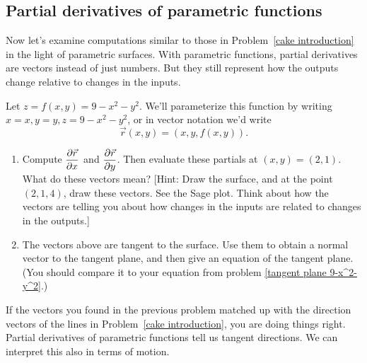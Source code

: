 \subsection{Partial derivatives of parametric functions}

Now let's examine computations similar to those in Problem~\ref{cake introduction} in the light of parametric surfaces.  With parametric functions, partial derivatives are vectors instead of just numbers.  But they still represent how the outputs change relative to changes in the inputs.

\begin{problem}%
%
 Let $z=f(x,y)=9-x^2-y^2$. We'll parameterize this function by writing $x=x, y=y, z=9-x^2-y^2$, or in vector notation we'd write $$\vec r(x,y) = (x,y,f(x,y)).$$ 
\begin{enumerate}
 \item Compute $\displaystyle \frac{\partial \vec r}{\partial x}$ and $\displaystyle \frac{\partial \vec r}{\partial y}$. Then evaluate these partials at $(x,y)=(2,1)$.  What do these vectors mean? [Hint: Draw the surface, and at the point $(2,1,4)$, draw these vectors. See the Sage plot.  Think about how the vectors are telling you about how changes in the inputs are related to changes in the outputs.]
 \item The vectors above are tangent to the surface. Use them to obtain a normal vector to the tangent plane, and then give an equation of the tangent plane. (You should compare it to your equation from problem \ref{tangent plane 9-x^2-y^2}.)
\end{enumerate}
\end{problem}

If the vectors you found in the previous problem matched up with the direction vectors of the lines in Problem~\ref{cake introduction}, you are doing things right.  Partial derivatives of parametric functions tell us tangent directions.  We can interpret this also in terms of motion.

